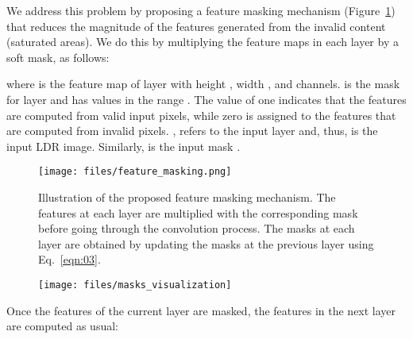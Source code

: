 We address this problem by proposing a feature masking mechanism (Figure~\ref{fig:feature_masking}) that reduces the magnitude of the features generated from the invalid content (saturated areas). We do this by multiplying the feature maps in each layer by a soft mask, as follows:

\vspace{-9pt}

\vspace{-10pt}

\noindent where  is the feature map of layer  with height , width , and  channels.  is the mask for layer  and has values in the range . The value of one indicates that the features are computed from valid input pixels, while zero is assigned to the features that are computed from invalid pixels. ,  refers to the input layer and, thus,  is the input LDR image. Similarly,  is the input mask  .  

\begin{figure}
  \texttt{[image: files/feature\_masking.png]}
  \vspace{-0.20in}
  \caption{Illustration of the proposed feature masking mechanism. The features at each layer are multiplied with the corresponding mask before going through the convolution process. The masks at each layer are obtained by updating the masks at the previous layer using Eq.~\ref{eqn:03}.}
  \label{fig:feature_masking}
  \vspace{-0.15in}
\end{figure}

\begin{figure}
  \texttt{[image: files/masks\_visualization]}
  \vspace{-0.3in}
  \caption{}
  \label{fig:masks}
  \vspace{-0.15in}
\end{figure}


Once the features of the current layer  are masked, the features in the next layer  are computed as usual:

